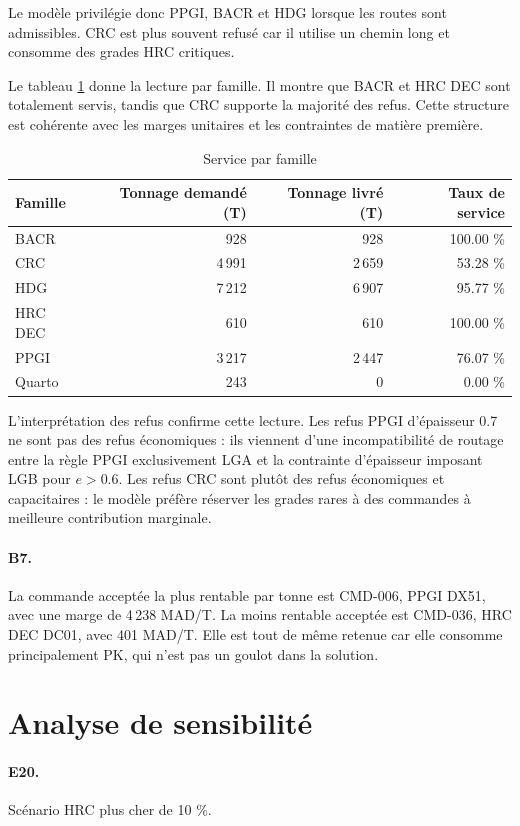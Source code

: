 \documentclass[12pt,a4paper]{article}
\newcommand{\question}[1]{\paragraph{\textcolor{blue!50!black}{#1.}}}
\newcommand{\sectiontarget}[1]{}
\begin{document}
Le modèle privilégie donc PPGI, BACR et HDG lorsque les routes sont admissibles. CRC est plus souvent refusé car il utilise un chemin long et consomme des grades HRC critiques.

Le tableau \ref{tab:service-famille} donne la lecture par famille. Il montre que BACR et HRC DEC sont totalement servis, tandis que CRC supporte la majorité des refus. Cette structure est cohérente avec les marges unitaires et les contraintes de matière première.

\begin{table}[H]
\centering
\caption{Service par famille}
\label{tab:service-famille}
\begin{tabular}{lrrr}
\toprule
Famille & Tonnage demandé (T) & Tonnage livré (T) & Taux de service \\
\midrule
BACR & 928 & 928 & 100.00 \% \\
CRC & 4\,991 & 2\,659 & 53.28 \% \\
HDG & 7\,212 & 6\,907 & 95.77 \% \\
HRC DEC & 610 & 610 & 100.00 \% \\
PPGI & 3\,217 & 2\,447 & 76.07 \% \\
Quarto & 243 & 0 & 0.00 \% \\
\bottomrule
\end{tabular}
\end{table}

L'interprétation des refus confirme cette lecture. Les refus PPGI d'épaisseur 0.7 ne sont pas des refus économiques : ils viennent d'une incompatibilité de routage entre la règle PPGI exclusivement LGA et la contrainte d'épaisseur imposant LGB pour $e>0.6$. Les refus CRC sont plutôt des refus économiques et capacitaires : le modèle préfère réserver les grades rares à des commandes à meilleure contribution marginale.

\question{B7}
La commande acceptée la plus rentable par tonne est CMD-006, PPGI DX51, avec une marge de 4\,238 MAD/T. La moins rentable acceptée est CMD-036, HRC DEC DC01, avec 401 MAD/T. Elle est tout de même retenue car elle consomme principalement PK, qui n'est pas un goulot dans la solution.

\clearpage
\section{Analyse de sensibilité}
\sectiontarget{2 a 3 pages}

\question{E20}
Scénario HRC plus cher de 10 \%.
\end{document}
